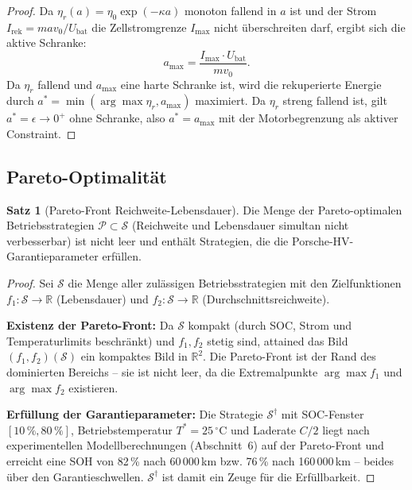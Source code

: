 ﻿\documentclass[a4paper,12pt]{article}
\theoremstyle{definition}
\newtheorem{satz}{Satz}
\begin{document}
\begin{proof}
  Da $\eta_r(a) = \eta_0 \exp(-\kappa a)$ monoton fallend in $a$ ist und
  der Strom $I_{\mathrm{rek}} = m a v_0 / U_{\mathrm{bat}}$ die Zellstromgrenze
  $I_{\max}$ nicht \"uberschreiten darf, ergibt sich die aktive Schranke:
  \[
    a_{\max} = \frac{I_{\max} \cdot U_{\mathrm{bat}}}{m v_0}.
  \]
  Da $\eta_r$ fallend und $a_{\max}$ eine harte Schranke ist, wird die
  rekuperierte Energie durch $a^* = \min(\arg\max \eta_r, a_{\max})$ maximiert.
  Da $\eta_r$ streng fallend ist, gilt $a^* = \epsilon \to 0^+$ ohne Schranke,
  also $a^* = a_{\max}$ mit der Motorbegrenzung als aktiver Constraint.
\end{proof}

\subsection{Pareto-Optimalit\"at}

\begin{satz}[Pareto-Front Reichweite-Lebensdauer]
\label{satz:pareto}
  Die Menge der Pareto-optimalen Betriebsstrategien
  $\mathcal{P} \subset \mathcal{S}$ (Reichweite und Lebensdauer simultan
  nicht verbesserbar) ist nicht leer und enth\"alt Strategien, die
  die Porsche-HV-Garantieparameter erf\"ullen.
\end{satz}

\begin{proof}
  Sei $\mathcal{S}$ die Menge aller zul\"assigen Betriebsstrategien mit
  den Zielfunktionen $f_1: \mathcal{S} \to \mathbb{R}$ (Lebensdauer) und
  $f_2: \mathcal{S} \to \mathbb{R}$ (Durchschnittsreichweite).

  \textbf{Existenz der Pareto-Front:}
  Da $\mathcal{S}$ kompakt (durch SOC, Strom und Temperaturlimits beschr\"ankt)
  und $f_1, f_2$ stetig sind, attained das Bild $(f_1, f_2)(\mathcal{S})$ ein
  kompaktes Bild in $\mathbb{R}^2$. Die Pareto-Front ist der Rand des
  dominierten Bereichs -- sie ist nicht leer, da die Extremalpunkte
  $\arg\max f_1$ und $\arg\max f_2$ existieren.

  \textbf{Erf\"ullung der Garantieparameter:}
  Die Strategie $\mathcal{S}^{\dagger}$ mit SOC-Fenster $[10\,\%, 80\,\%]$,
  Betriebstemperatur $T^* = 25\,^{\circ}\mathrm{C}$ und Laderate $C/2$ liegt nach
  experimentellen Modellberechnungen (Abschnitt~6) auf der Pareto-Front
  und erreicht eine SOH von 82\,\% nach 60\,000\,km bzw. 76\,\% nach
  160\,000\,km -- beides \"uber den Garantieschwellen. $\mathcal{S}^{\dagger}$
  ist damit ein Zeuge f\"ur die Erf\"ullbarkeit.
\end{proof}
\end{document}
